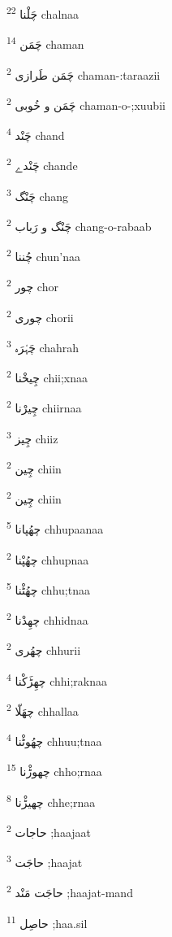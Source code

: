 \documentclass[12pt]{article}
\begin{document}
\begin{RTL}
\begin{multicols}{5}
{\ur چَلْنا}   \textsuperscript{22} chalnaa

{\ur چَمَن}   \textsuperscript{14} chaman

{\ur چَمَن طَرازی}   \textsuperscript{2} chaman-:taraazii

{\ur چَمَن و خُوبی}   \textsuperscript{2} chaman-o-;xuubii

{\ur چَنْد}   \textsuperscript{4} chand

{\ur چَنْدے}   \textsuperscript{2} chande

{\ur چَنْگ}   \textsuperscript{3} chang

{\ur چَنْگ و رَباب}   \textsuperscript{2} chang-o-rabaab

{\ur چُننا}   \textsuperscript{2} chun'naa

{\ur چور}   \textsuperscript{2} chor

{\ur چوری}   \textsuperscript{2} chorii

{\ur چَہْرَہ}   \textsuperscript{3} chahrah

{\ur چِیخْنا}   \textsuperscript{2} chii;xnaa

{\ur چِیرْنا}   \textsuperscript{2} chiirnaa

{\ur چِیز}   \textsuperscript{3} chiiz

{\ur چِین}   \textsuperscript{2} chiin

{\ur چِین}   \textsuperscript{2} chiin

{\ur چھُپانا}   \textsuperscript{5} chhupaanaa

{\ur چھُپْنا}   \textsuperscript{2} chhupnaa

{\ur چھُٹْنا}   \textsuperscript{5} chhu;tnaa

{\ur چھِدْنا}   \textsuperscript{2} chhidnaa

{\ur چھُری}   \textsuperscript{2} chhurii

{\ur چھِڑَکْنا}   \textsuperscript{4} chhi;raknaa

{\ur چھَلّا}   \textsuperscript{2} chhallaa

{\ur چھُوٹْنا}   \textsuperscript{4} chhuu;tnaa

{\ur چھوڑْنا}   \textsuperscript{15} chho;rnaa

{\ur چھیڑْنا}   \textsuperscript{8} chhe;rnaa

{\ur حاجات}   \textsuperscript{2} ;haajaat

{\ur حاجَت}   \textsuperscript{3} ;haajat

{\ur حاجَت مَنْد}   \textsuperscript{2} ;haajat-mand

{\ur حاصِل}   \textsuperscript{11} ;haa.sil


\end{multicols}
\end{RTL}
\end{document}
